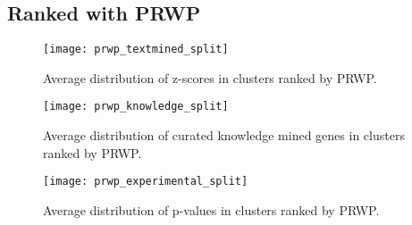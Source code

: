 \subsection{Ranked with PRWP}
\begin{figure}
    \label{fig:txt-iref-prwp}
    \texttt{[image: prwp\_textmined\_split]}
    \caption{Average distribution of z-scores in clusters ranked by PRWP.}
\end{figure}
\begin{figure}
    \label{fig:know-iref-prwp}
    \texttt{[image: prwp\_knowledge\_split]}
    \caption{Average distribution of curated knowledge mined genes in clusters
    ranked by PRWP.}
\end{figure}
\begin{figure}
    \label{fig:exp-iref-prwp}
    \texttt{[image: prwp\_experimental\_split]}
    \caption{Average distribution of p-values in clusters ranked by PRWP.}
\end{figure}
